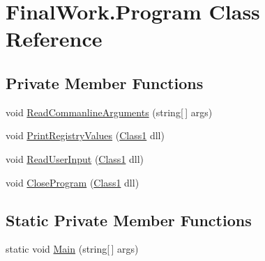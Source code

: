 \hypertarget{class_final_work_1_1_program}{}\section{Final\+Work.\+Program Class Reference}
\label{class_final_work_1_1_program}
\subsection*{Private Member Functions}
\begin{DoxyCompactItemize}
\item 
void \hyperlink{class_final_work_1_1_program_a553c892f82abf7fcfd9057ece85c11f5}{Read\+Commanline\+Arguments} (string\mbox{[}$\,$\mbox{]} args)
\item 
void \hyperlink{class_final_work_1_1_program_ae645f04225fb80add67841029cdf6594}{Print\+Registry\+Values} (\hyperlink{class_projectdll_1_1_class1}{Class1} dll)
\item 
void \hyperlink{class_final_work_1_1_program_ab669be7d2c3db874295f7b4256e9aa9f}{Read\+User\+Input} (\hyperlink{class_projectdll_1_1_class1}{Class1} dll)
\item 
void \hyperlink{class_final_work_1_1_program_a479f55810ed808f361519bcac3b0d205}{Close\+Program} (\hyperlink{class_projectdll_1_1_class1}{Class1} dll)
\end{DoxyCompactItemize}
\subsection*{Static Private Member Functions}
\begin{DoxyCompactItemize}
\item 
static void \hyperlink{class_final_work_1_1_program_af638f741e19f626809c2bf6f2a028e83}{Main} (string\mbox{[}$\,$\mbox{]} args)
\end{DoxyCompactItemize}

